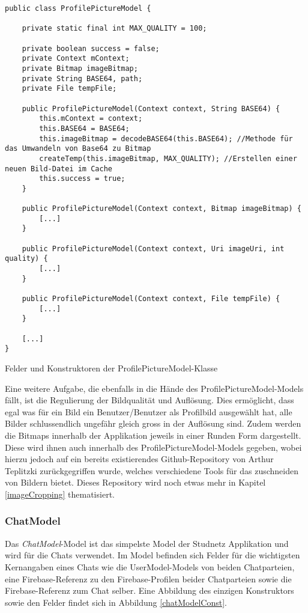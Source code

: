 \documentclass[../main.tex]{subfiles}
\begin{document}
\begin{code}
	\begin{center}
		\begin{verbatim}
public class ProfilePictureModel {

	private static final int MAX_QUALITY = 100;

	private boolean success = false;
	private Context mContext;
	private Bitmap imageBitmap;
	private String BASE64, path;
	private File tempFile;

	public ProfilePictureModel(Context context, String BASE64) {
		this.mContext = context;
		this.BASE64 = BASE64;
		this.imageBitmap = decodeBASE64(this.BASE64); //Methode für das Umwandeln von Base64 zu Bitmap
		createTemp(this.imageBitmap, MAX_QUALITY); //Erstellen einer neuen Bild-Datei im Cache
		this.success = true;
	}

	public ProfilePictureModel(Context context, Bitmap imageBitmap) {
		[...]
	}

	public ProfilePictureModel(Context context, Uri imageUri, int quality) {
		[...]
	}

	public ProfilePictureModel(Context context, File tempFile) {
		[...]
	}
	
	[...]
}
		\end{verbatim}
		\caption{Felder und Konstruktoren der ProfilePictureModel-Klasse}
		\label{profilePictureModelConst}
	\end{center}
	
\end{code}

	Eine weitere Aufgabe, die ebenfalls in die Hände des ProfilePictureModel-Models fällt, ist die Regulierung der Bildqualität und Auflösung. Dies ermöglicht, dass egal was für ein Bild ein Benutzer/Benutzer als Profilbild ausgewählt hat, alle Bilder schlussendlich ungefähr gleich gross in der Auflösung sind. Zudem werden die Bitmaps innerhalb der Applikation jeweils in einer Runden Form dargestellt. Diese wird ihnen auch innerhalb des ProfilePictureModel-Models gegeben, wobei hierzu jedoch auf ein bereits existierendes Github-Repository von Arthur Teplitzki zurückgegriffen wurde, welches verschiedene Tools für das zuschneiden von Bildern bietet. Dieses Repository wird noch etwas mehr in Kapitel \ref{imageCropping} thematisiert.
	
	\subsubsection{ChatModel}
	Das \emph{ChatModel}-Model ist das simpelste Model der Studnetz Applikation und wird für die Chats verwendet. Im Model befinden sich Felder für die wichtigsten Kernangaben eines Chats wie die UserModel-Models von beiden Chatparteien, eine Firebase-Referenz zu den Firebase-Profilen beider Chatparteien sowie die Firebase-Referenz zum Chat selber. Eine Abbildung des einzigen Konstruktors sowie den Felder findet sich in Abbildung \ref{chatModelConst}.
	
\end{document}
